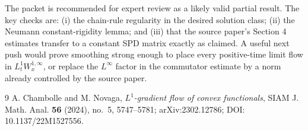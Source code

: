 \documentclass[11pt]{article}
\begin{document}
The packet is recommended for expert review as a likely valid partial result.
The key checks are: (i) the chain-rule regularity in the desired solution
class; (ii) the Neumann constant-rigidity lemma; and (iii) that the source
paper's Section 4 estimates transfer to a constant SPD matrix exactly as
claimed.  A useful next push would prove smoothing strong enough to place
every positive-time limit flow in $L^1_tW^{1,\infty}_x$, or replace the
$L^\infty$ factor in the commutator estimate by a norm already controlled by
the source paper.

\begin{thebibliography}{9}
A. Chambolle and M. Novaga,
\emph{$L^1$-gradient flow of convex functionals},
SIAM J. Math. Anal. \textbf{56} (2024), no.~5, 5747--5781;
arXiv:2302.12786; DOI: 10.1137/22M1527556.
\end{thebibliography}
\end{document}
